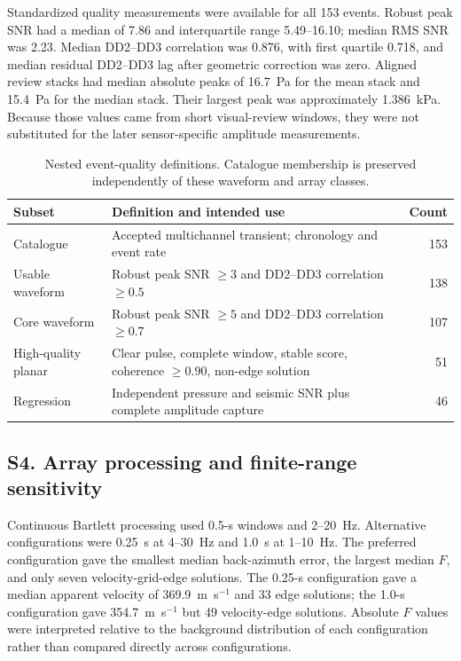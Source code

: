 \documentclass[]{seismica}
\begin{document}
Standardized quality measurements were available for all 153 events. Robust
peak SNR had a median of 7.86 and interquartile range 5.49--16.10; median RMS
SNR was 2.23. Median DD2--DD3 correlation was 0.876, with first quartile
0.718, and median residual DD2--DD3 lag after geometric correction was zero.
Aligned review stacks had median absolute peaks of 16.7~Pa for the mean stack
and 15.4~Pa for the median stack. Their largest peak was approximately
1.386~kPa. Because those values came from short visual-review windows, they
were not substituted for the later sensor-specific amplitude measurements.

\begin{table}[!tbp]
\centering
\caption{Nested event-quality definitions. Catalogue membership is preserved
independently of these waveform and array classes.}
\label{tab:supp_quality}
\begin{tabularx}{\textwidth}{lXr}
\hline
Subset & Definition and intended use & Count \\
\hline
Catalogue & Accepted multichannel transient; chronology and event rate & 153 \\
Usable waveform & Robust peak SNR $\geq3$ and DD2--DD3 correlation $\geq0.5$ & 138 \\
Core waveform & Robust peak SNR $\geq5$ and DD2--DD3 correlation $\geq0.7$ & 107 \\
High-quality planar & Clear pulse, complete window, stable score, coherence $\geq0.90$, non-edge solution & 51 \\
Regression & Independent pressure and seismic SNR plus complete amplitude capture & 46 \\
\hline
\end{tabularx}
\end{table}

\FloatBarrier
\subsection{S4. Array processing and finite-range sensitivity}
\label{sec:supp_array}

Continuous Bartlett processing used 0.5-s windows and 2--20~Hz. Alternative
configurations were 0.25~s at 4--30~Hz and 1.0~s at 1--10~Hz. The preferred
configuration gave the smallest median back-azimuth error, the largest median
$F$, and only seven velocity-grid-edge solutions. The 0.25-s configuration
gave a median apparent velocity of 369.9~m~s$^{-1}$ and 33 edge solutions;
the 1.0-s configuration gave 354.7~m~s$^{-1}$ but 49 velocity-edge solutions.
Absolute $F$ values were interpreted relative to the background distribution
of each configuration rather than compared directly across configurations.
\end{document}
